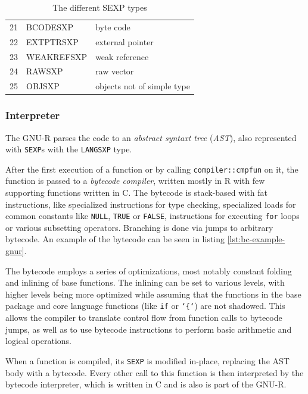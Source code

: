 \begin{table}[h!]
\begin{tabular}{c l l}
		21          & BCODESXP          & byte code                  \\
		22          & EXTPTRSXP         & external pointer           \\
		23          & WEAKREFSXP        & weak reference             \\
		24          & RAWSXP            & raw vector                 \\
		25          & OBJSXP            & objects not of simple type \\
	\end{tabular}
	\caption{The different SEXP types\cite[1.1.1 SEXPTYPEs]{rprojectInternals}}\label{tbl:sexptype}
\end{table}

\subsubsection*{Interpreter}

The GNU-R parses the code to an \textit{abstract syntaxt tree} (\textit{AST}), also represented with \texttt{SEXP}s with the \texttt{LANGSXP} type. 

After the first execution of a function or by calling \texttt{compiler::cmpfun} on it, the function is passed to a \textit{bytecode compiler}, written mostly in R with few supporting functions written in C. The bytecode is stack-based with fat instructions, like specialized instructions for type checking, specialized loads for common constants like \texttt{NULL}, \texttt{TRUE} or \texttt{FALSE}, instructions for executing \texttt{for} loops or various subsetting operators. Branching is done via jumps to arbitrary bytecode. An example of the bytecode can be seen in listing \ref{lst:bc-example-gnur}.

The bytecode employs a series of optimizations, most notably constant folding and inlining of base functions. The inlining can be set to various levels, with higher levels being more optimized while assuming that the functions in the base package and core language functions (like \texttt{if} or \texttt{`\{`}) are not shadowed. This allows the compiler to translate control flow from function calls to bytecode jumps, as well as to use bytecode instructions to perform basic arithmetic and logical operations.

When a function is compiled, its \texttt{SEXP} is modified in-place, replacing the AST body with a bytecode. Every other call to this function is then interpreted by the bytecode interpreter, which is written in C and is also is part of the GNU-R.

